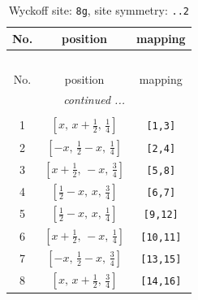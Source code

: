 \documentclass[fleqn,8pt]{jsarticle}
\begin{document}
\renewcommand{\arraystretch}{1.2}
\begin{longtable}{ccc}
\caption{Wyckoff site: {\tt 8g}, site symmetry: {\tt ..2}}
 \\
 \hline \hline
No. & position & mapping \\ \hline \endfirsthead

\multicolumn{2}{l}{\tablename\ \thetable{}} \\
 \hline \hline
No. & position & mapping \\ \hline \endhead

 \hline \hline
\multicolumn{2}{r}{\footnotesize\it continued ...} \\ \endfoot

 \hline \hline
\multicolumn{2}{r}{} \\ \endlastfoot

1 & $\left[ x,\, x + \frac{1}{2},\, \frac{1}{4} \right]$ & {\tt [1,3]} \\ \hline
2 & $\left[ - x,\, \frac{1}{2} - x,\, \frac{1}{4} \right]$ & {\tt [2,4]} \\ \hline
3 & $\left[ x + \frac{1}{2},\, - x,\, \frac{3}{4} \right]$ & {\tt [5,8]} \\ \hline
4 & $\left[ \frac{1}{2} - x,\, x,\, \frac{3}{4} \right]$ & {\tt [6,7]} \\ \hline
5 & $\left[ \frac{1}{2} - x,\, x,\, \frac{1}{4} \right]$ & {\tt [9,12]} \\ \hline
6 & $\left[ x + \frac{1}{2},\, - x,\, \frac{1}{4} \right]$ & {\tt [10,11]} \\ \hline
7 & $\left[ - x,\, \frac{1}{2} - x,\, \frac{3}{4} \right]$ & {\tt [13,15]} \\ \hline
8 & $\left[ x,\, x + \frac{1}{2},\, \frac{3}{4} \right]$ & {\tt [14,16]} \\
\end{longtable}
\renewcommand{\arraystretch}{1.2}
\end{document}
